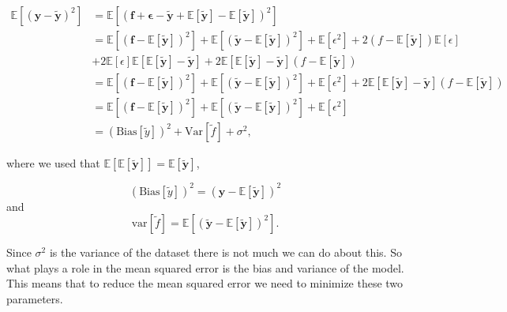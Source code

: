 \begin{align*}
\mathbb{E}\left[(\mathbf{y}-\mathbf{\tilde{y}})^2\right]
&=\mathbb{E}\left[(\mathbf{f}+\mathbf{\epsilon}-\mathbf{\tilde{y}}+\mathbb{E}\left[\mathbf{\tilde{y}}\right]-\mathbb{E}\left[\mathbf{\tilde{y}}\right])^2\right]
\\
&= \mathbb{E}\left[(\mathbf{f}-\mathbb{E}[\mathbf{\tilde y}])^2 \right] + \mathbb{E}\left[(\mathbf{\tilde y}-\mathbb{E}[\mathbf{\tilde{y}}])^2\right] + \mathbb{E}[\epsilon^2] + 2(f-\mathbb{E}[\mathbf{\tilde y}])\mathbb{E}[\epsilon]
\\
&+2\mathbb{E}[\epsilon]\mathbb{E}\left[\mathbb{E}[\mathbf{\tilde y}]-\mathbf{\tilde y} \right] + 2\mathbb{E}\left[\mathbb{E}[\mathbf{\tilde y}] -\mathbf{\tilde y} \right](f - \mathbb{E}[\mathbf{\tilde y}])
\\
&=\mathbb{E}\left[(\mathbf{f}-\mathbb{E}[\mathbf{\tilde y}])^2 \right]  + \mathbb{E}\left[(\mathbf{\tilde y}-\mathbb{E}[\mathbf{\tilde{y}}])^2\right]+ \mathbb{E}[\epsilon^2] + 2\mathbb{E}\left[\mathbb{E}[\mathbf{\tilde y}] -\mathbf{\tilde y} \right](f - \mathbb{E}[\mathbf{\tilde y}])
\\
&= \mathbb{E}\left[(\mathbf{f}-\mathbb{E}[\mathbf{\tilde y}])^2 \right]  +\mathbb{E}\left[(\mathbf{\tilde y}-\mathbb{E}[\mathbf{\tilde{y}}])^2\right] + \mathbb{E}[\epsilon^2]
\\
&=\left(\mbox{Bias}\left[{\tilde y}\right] \right)^2 + \mbox{Var}\left[{\tilde f} \right] + \sigma^2,
\end{align*}

where we used that $\mathbb{E}\left[\mathbb{E}[\mathbf{\tilde y}]\right]=\mathbb{E}[\mathbf{\tilde y}]$, 

\begin{equation}\label{eq:bias_ytilde}
(\mathrm{Bias}[\tilde{y}])^2=\left(\boldsymbol{y}-\mathbb{E}\left[\boldsymbol{\tilde{y}}\right]\right)^2
\end{equation}
and
\begin{equation}\label{eq:variance_ftilde}
\mathrm{var}[\tilde{f}]=\mathbb{E}\left[(\mathbf{\tilde y}-\mathbb{E}[\mathbf{\tilde{y}}])^2\right].
\end{equation}

Since $\sigma^2$ is the variance of the dataset there is not much we can do about this. So what plays a role in the mean squared error is the bias and variance of the model. This means that to reduce the mean squared error we need to minimize these two parameters. 





